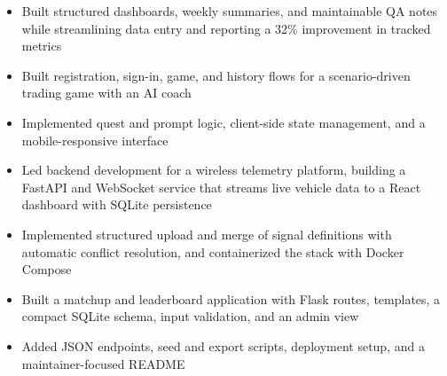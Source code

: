 \documentclass[10pt,letterpaper]{article}
\begin{document}
\entryspace

\begin{itemize}
  \item Built structured dashboards, weekly summaries, and maintainable QA notes while streamlining data entry and reporting a 32\% improvement in tracked metrics
\end{itemize}


\begin{itemize}
  \item Built registration, sign-in, game, and history flows for a scenario-driven trading game with an AI coach
  \item Implemented quest and prompt logic, client-side state management, and a mobile-responsive interface
\end{itemize}

\entryspace

\begin{itemize}
  \item Led backend development for a wireless telemetry platform, building a FastAPI and WebSocket service that streams live vehicle data to a React dashboard with SQLite persistence
  \item Implemented structured upload and merge of signal definitions with automatic conflict resolution, and containerized the stack with Docker Compose
\end{itemize}

\entryspace

\begin{itemize}
  \item Built a matchup and leaderboard application with Flask routes, templates, a compact SQLite schema, input validation, and an admin view
  \item Added JSON endpoints, seed and export scripts, deployment setup, and a maintainer-focused README
\end{itemize}
\end{document}
